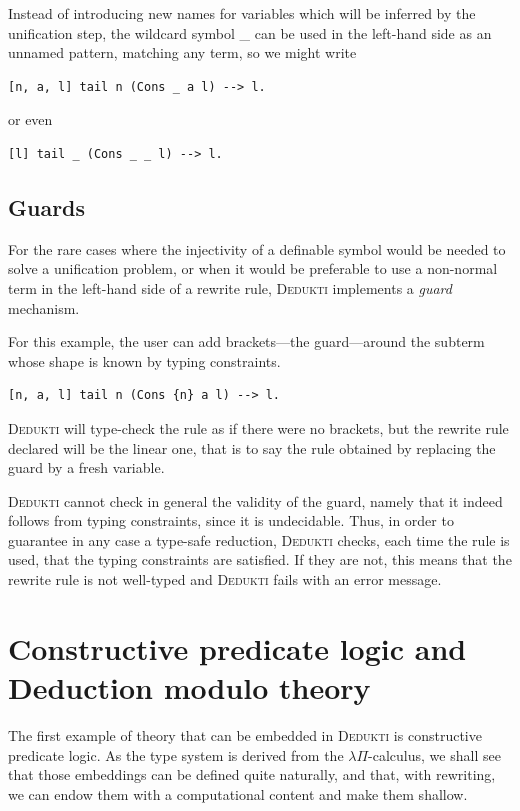 \documentclass[english]{lipics}
\begin{document}
Instead of introducing new names for variables which will be inferred
by the unification step, the wildcard symbol \_ can be used in the
left-hand side as an unnamed pattern, matching any term, so we might write
\begin{lstlisting}
[n, a, l] tail n (Cons _ a l) --> l.
\end{lstlisting}
or even
\begin{lstlisting}
[l] tail _ (Cons _ _ l) --> l.
\end{lstlisting}

\subsection{Guards}

For the rare cases where the injectivity of a definable symbol would be
needed to solve a unification problem, or when it would be
preferable to use a non-normal term in the left-hand side of a rewrite
rule, \textsc{Dedukti} implements a {\em guard} mechanism.

For this example, the user can add brackets---the guard---around the
subterm whose shape is known by typing constraints.
\begin{lstlisting}
[n, a, l] tail n (Cons {n} a l) --> l.
\end{lstlisting}
\textsc{Dedukti} will type-check the rule as if there were no
brackets, but the rewrite rule declared will be the linear one, that
is to say the rule obtained by replacing the guard by a fresh
variable.

\textsc{Dedukti} cannot check in general the validity of the guard,
namely that it indeed follows from typing constraints, since it is
undecidable. Thus, in order to guarantee in any case a type-safe
reduction, \textsc{Dedukti} checks, each time the rule is used, that
the typing constraints are satisfied.  If they are not, this means that
the rewrite rule is not well-typed and \textsc{Dedukti} fails with an
error message.

\section{Constructive predicate logic and Deduction modulo theory}
\label{sec:constructive}

The first example of theory that can be embedded in \textsc{Dedukti}
is constructive predicate logic. As the type system is derived from
the $\lambda \Pi$-calculus, we shall see that those embeddings can be
defined quite naturally, and that, with rewriting, we can endow them
with a computational content and make them shallow.
\end{document}
